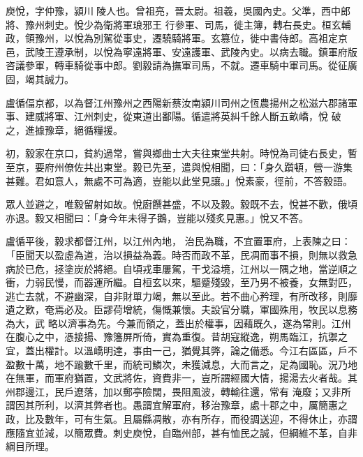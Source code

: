 
\begin{pinyinscope}

 庾悅，字仲豫，潁川𨻳陵人也。曾祖亮，晉太尉。祖羲，吳國內史。父準，西中郎將、豫州刺史。悅少為衛將軍琅邪王
 行參軍、司馬，徙主簿，轉右長史。桓玄輔政，領豫州，以悅為別駕從事史，遷驍騎將軍。玄篡位，徙中書侍郎。高祖定京邑，武陵王遵承制，以悅為寧遠將軍、安遠護軍、武陵內史。以病去職。鎮軍府版咨議參軍，轉車騎從事中郎。劉毅請為撫軍司馬，不就。遷車騎中軍司馬。從征廣固，竭其誠力。



 盧循偪京都，以為督江州豫州之西陽新蔡汝南潁川司州之恆農揚州之松滋六郡諸軍事、建威將軍、江州刺史，從東道出鄱陽。循遣將英糾千餘人斷五畝嶠，悅
 破之，進據豫章，絕循糧援。



 初，毅家在京口，貧約過常，嘗與鄉曲士大夫往東堂共射。時悅為司徒右長史，暫至京，要府州僚佐共出東堂。毅已先至，遣與悅相聞，曰：「身久躓頓，營一游集甚難。君如意人，無處不可為適，豈能以此堂見讓。」悅素豪，徑前，不答毅語。



 眾人並避之，唯毅留射如故。悅廚饌甚盛，不以及毅。毅既不去，悅甚不歡，俄頃亦退。毅又相聞曰：「身今年未得子鵝，豈能以殘炙見惠。」悅又不答。



 盧循平後，毅求都督江州，以江州內地，
 治民為職，不宜置軍府，上表陳之曰：「臣聞天以盈虛為道，治以損益為義。時否而政不革，民凋而事不損，則無以救急病於已危，拯塗炭於將絕。自頃戎車屢駕，干戈溢境，江州以一隅之地，當逆順之衝，力弱民慢，而器運所繼。自桓玄以來，驅蹙殘毀，至乃男不被養，女無對匹，逃亡去就，不避幽深，自非財單力竭，無以至此。若不曲心矜理，有所改移，則靡遺之歎，奄焉必及。臣謬荷增統，傷慨兼懷。夫設官分職，軍國殊用，牧民以息務為大，武
 略以濟事為先。今兼而領之，蓋出於權事，因藉既久，遂為常則。江州在腹心之中，憑接揚、豫籓屏所倚，實為重復。昔胡寇縱逸，朔馬臨江，抗禦之宜，蓋出權計。以溫嶠明達，事由一己，猶覺其弊，論之備悉。今江右區區，戶不盈數十萬，地不踰數千里，而統司鱗次，未獲減息，大而言之，足為國恥。況乃地在無軍，而軍府猶置，文武將佐，資費非一，豈所謂經國大情，揚湯去火者哉。其州郡邊江，民戶遼落，加以郵亭險闊，畏阻風波，轉輸往還，常有
 淹廢；又非所謂因其所利，以濟其弊者也。愚謂宜解軍府，移治豫章，處十郡之中，厲簡惠之政，比及數年，可有生氣。且屬縣凋散，亦有所存，而役調送迎，不得休止，亦謂應隨宜並減，以簡眾費。刺史庾悅，自臨州部，甚有恤民之誠，但綱維不革，自非綱目所理。




\end{pinyinscope}
